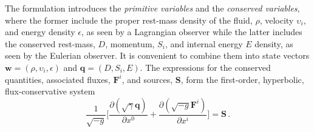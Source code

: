 %
The formulation introduces the \textit{primitive variables} and the \textit{conserved variables},
where the former include the proper rest-mass density of the fluid, $\rho$, 
velocity $\upsilon_i$, and energy density $\epsilon$, as seen by a Lagrangian observer 
while the latter includes 
the conserved rest-mass, $D$, momentum, $S_i$, and internal energy $E$
density, as seen by the Eulerian observer.
%
It is convenient to combine them into state vectors 
$\boldsymbol{w}=(\rho,\upsilon_i,\epsilon)$ and $\boldsymbol{q}=(D,S_i,E)$.
The expressions for the conserved quantities, associated fluxes, $\boldsymbol{F}^i$,  
and sources, $\boldsymbol{S}$, form the first-order, hyperbolic, flux-conservative system  
\begin{equation}
\frac{1}{\sqrt{-g}}\Big[\frac{\partial(\sqrt{\gamma}\boldsymbol{q})}{\partial x^0} + \frac{\partial(\sqrt{-g}\boldsymbol{F}^{i})}{\partial x^i}\Big] = \boldsymbol{S}\, .
\label{eq:theory:valencia} %
\end{equation}
